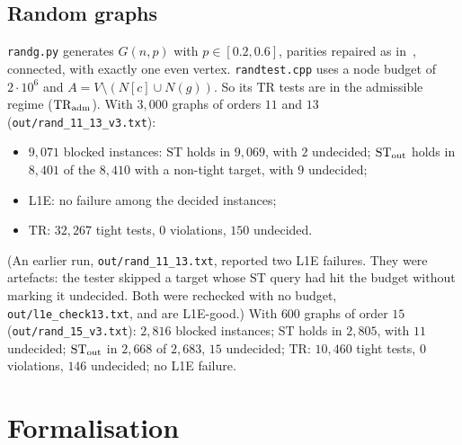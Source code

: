 \documentclass[11pt]{amsart}
\theoremstyle{definition}
\newcommand{\TR}{\mathrm{TR}}
\newcommand{\ST}{\mathrm{ST}}
\begin{document}
\subsection*{Random graphs}
\texttt{randg.py} generates $G(n,p)$ with $p\in[0.2,0.6]$, parities repaired as in~\cite{L1S},
connected, with exactly one even vertex. \texttt{randtest.cpp} uses a node budget of $2\cdot10^6$ and
$A=V\setminus(N[c]\cup N(g))$. So its $\TR$ tests are in the admissible regime ($\TR_{\rm adm}$). With
$3{,}000$ graphs of orders $11$ and $13$ (\texttt{out/rand\_11\_13\_v3.txt}):
\begin{itemize}
\item $9{,}071$ blocked instances: $\ST$ holds in $9{,}069$, with $2$ undecided; $\ST_{\rm out}$ holds
in $8{,}401$ of the $8{,}410$ with a non-tight target, with $9$ undecided;
\item L1E: no failure among the decided instances;
\item $\TR$: $32{,}267$ tight tests, $0$ violations, $150$ undecided.
\end{itemize}
(An earlier run, \texttt{out/rand\_11\_13.txt}, reported two L1E failures. They were artefacts: the
tester skipped a target whose $\ST$ query had hit the budget without marking it undecided. Both were
rechecked with no budget, \texttt{out/l1e\_check13.txt}, and are L1E-good.) With $600$ graphs
of order $15$ (\texttt{out/rand\_15\_v3.txt}): $2{,}816$ blocked instances; $\ST$ holds in $2{,}805$,
with $11$ undecided; $\ST_{\rm out}$ in $2{,}668$ of $2{,}683$, $15$ undecided; $\TR$: $10{,}460$ tight
tests, $0$ violations, $146$ undecided; no L1E failure.

\section{Formalisation}\label{sec:lean}
\end{document}
